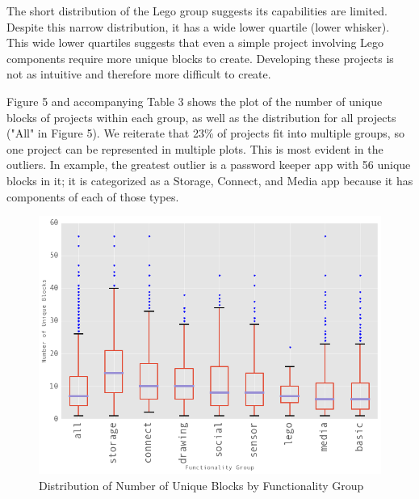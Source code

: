 \documentclass[conference]{IEEEtran}
\begin{document}
The short distribution of the Lego group suggests its capabilities are limited. Despite this narrow distribution, it has a wide lower quartile (lower whisker). This wide lower quartiles suggests that even a simple project involving Lego components require more unique blocks to create. Developing these projects is not as intuitive and therefore more difficult to create.

Figure 5 and accompanying Table 3 shows the plot of the number of unique blocks of projects within each group, as well as the distribution for all projects ("All" in Figure 5). We reiterate that 23\% of projects fit into multiple groups, so one project can be represented in multiple plots. This is most evident in the outliers. In example, the greatest outlier is a password keeper app with 56 unique blocks in it; it is categorized as a Storage, Connect, and Media app because it has components of each of those types.

\begin{figure}[h!]
	\centering
	\includegraphics[width=1\linewidth]{boxplot.png}
	\caption{Distribution of Number of Unique Blocks by Functionality Group}
	\label{Distribution of Num of Unique Blocks}
\end{figure}
\end{document}
